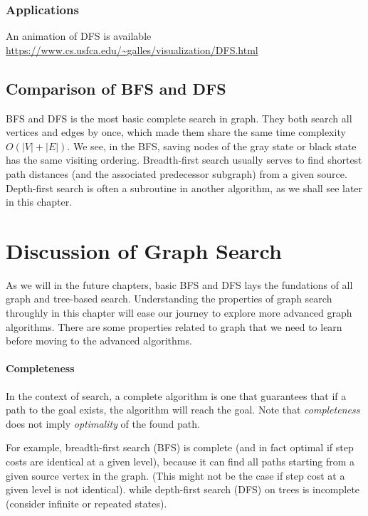 \documentclass[main.tex]{subfiles}
\begin{document}
\subsubsection{Applications}

An animation of DFS is available \url{https://www.cs.usfca.edu/~galles/visualization/DFS.html}





\subsection{Comparison of BFS and DFS}
BFS and DFS is the most basic complete search in graph. They both search all vertices and edges by once, which made them share the same time complexity $O(|V|+|E|)$. We see, in the BFS, saving nodes of the gray state or black state has the same visiting ordering. Breadth-first search usually serves to find shortest path distances (and the associated predecessor subgraph) from a given source. Depth-first search is often a subroutine in another algorithm, as we shall see later in this chapter.
\section{Discussion of Graph Search}
\label{graph_types}
As we will in the future chapters, basic BFS and DFS lays the fundations of all graph and tree-based search. Understanding the properties of graph search throughly in this chapter will ease our journey to explore more advanced graph algorithms. 
There are some properties related to graph that we need to learn before moving to the advanced algorithms.

\paragraph{Completeness}
In the context of search, a complete algorithm is one that guarantees that if a path to the goal exists, the algorithm will reach the goal. Note that \textit{completeness} does not imply \textit{optimality} of the found path.

For example, breadth-first search (BFS) is complete (and in fact optimal if step costs are identical at a given level), because it can find all paths starting from a given source vertex in the graph. (This might not be the case if step cost at a given level is not identical). while depth-first search (DFS) on trees is incomplete (consider infinite or repeated states).
\end{document}
